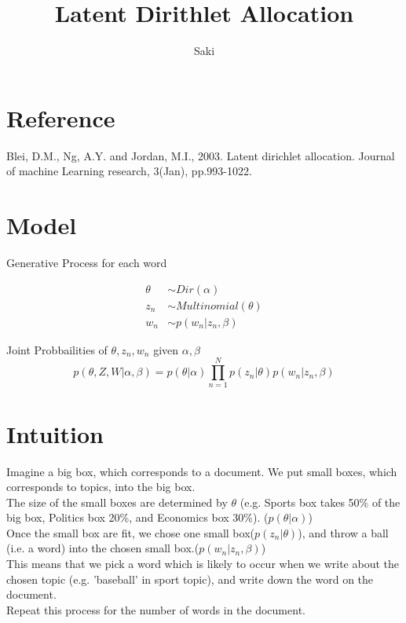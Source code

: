 \documentclass[a4paper, uplatex]{jsarticle} %
\title{Latent Dirithlet Allocation}
\author{Saki}
\begin{document}
\maketitle

\begin{abstract}
\end{abstract}

\section{Reference}
Blei, D.M., Ng, A.Y. and Jordan, M.I., 2003. Latent dirichlet allocation. Journal of machine Learning research, 3(Jan), pp.993-1022.

\section{Model}
Generative Process for each word 

\begin{align*}
\theta &\sim Dir(\alpha) \\
z_n &\sim Multinomial(\theta) \\
w_n &\sim p(w_n|z_n, \beta)
\end{align*}

Joint Probbailities of $\theta, z_n, w_n$ given $\alpha, \beta$
$$
p(\theta, Z, W| \alpha, \beta) = p(\theta | \alpha) \prod_{n=1}^N p(z_n|\theta) p(w_n|z_n, \beta)
$$

\section{Intuition}
Imagine a big box, which corresponds to a document. We put small boxes, which corresponds to topics, into the big box.\\ 
The size of the small boxes are determined by $\theta$ (e.g. Sports box takes 50\% of the big box, Politics box 20\%, and Economics box 30\%). ($p(\theta|\alpha)$) \\
Once the small box are fit, we chose one small box($p(z_n|\theta)$), and throw a ball (i.e. a word) into the chosen small box.($p(w_n|z_n,\beta)$) \\
This means that we pick a word which is likely to occur when we write about the chosen topic (e.g. 'baseball' in sport topic), and write down the word on the document. \\
Repeat this process for the number of words in the document. 
\end{document}

